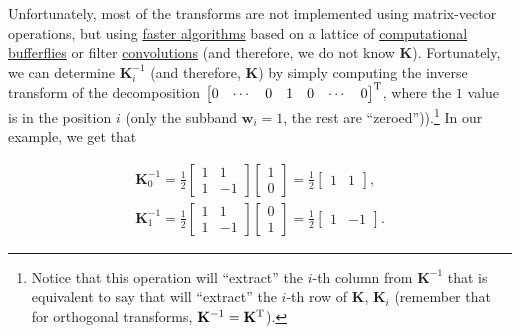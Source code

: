 Unfortunately, most of the transforms are not implemented using
matrix-vector operations, but using
\href{https://en.wikipedia.org/wiki/Fast_Fourier_transform}{faster
  algorithms} based on a lattice of
\href{https://en.wikipedia.org/wiki/Butterfly_diagram}{computational
  bufferflies} or filter
\href{https://en.wikipedia.org/wiki/Filter_(signal_processing)}{convolutions}
(and therefore, we do not know ${\mathbf K}$). Fortunately, we can
determine ${\mathbf K}_i^{-1}$ (and therefore, ${\mathbf K}$) by simply computing the inverse transform of
the decomposition
$\begin{bmatrix} 0 & \cdots & 0 & 1 & 0 & \cdots &
  0 \end{bmatrix}^{\text T}$, where the $1$ value is in the position
$i$ (only the subband ${\mathbf w}_i=1$, the rest are
``zeroed'')).\footnote{Notice that this operation will ``extract'' the
  $i$-th column from ${\mathbf K}^{-1}$ that is equivalent to say that
  will ``extract'' the $i$-th row of ${\mathbf K}$, ${\mathbf K}_i$
  (remember that for orthogonal transforms,
  ${\mathbf K}^{-1}={\mathbf K}^{\text T}$).} In our example, we get
that

\begin{equation}
  \begin{array}{l}
    {\mathbf K}_0^{-1} = \frac{1}{2}
    \begin{bmatrix}
      1 & 1 \\
      1 & -1
    \end{bmatrix} 
          \begin{bmatrix}
            1 \\
            0
          \end{bmatrix}
    =  \frac{1}{2}
    \begin{bmatrix}
      1 & 1
    \end{bmatrix},
    \\
    {\mathbf K}_1^{-1} =  \frac{1}{2}
    \begin{bmatrix}
      1 & 1 \\
      1 & -1
    \end{bmatrix}
          \begin{bmatrix}
            0 \\
            1
          \end{bmatrix}
    =  \frac{1}{2}
    \begin{bmatrix}
      1 & -1
    \end{bmatrix}.
  \end{array}
\end{equation}
\begin{comment}
that, as you can see, correspond to the columns of the inverse
transform matrix ${\mathbf K}^{-1}$. Notice that this is true for all orthogonal transforms whose analysis and synthesis matrices are symmetric. %
\end{comment}

